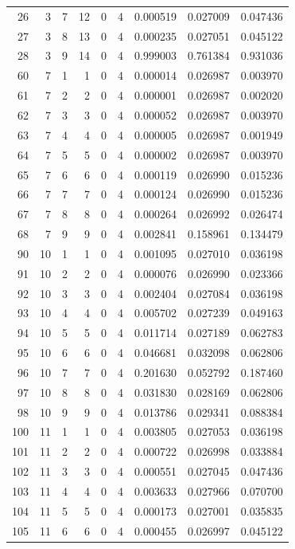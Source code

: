 \begin{longtable}{rrrrrrrrr}
26 & 3 & 7 & 12 & 0 & 4 & 0.000519 & 0.027009 & 0.047436 \\
27 & 3 & 8 & 13 & 0 & 4 & 0.000235 & 0.027051 & 0.045122 \\
28 & 3 & 9 & 14 & 0 & 4 & 0.999003 & 0.761384 & 0.931036 \\
60 & 7 & 1 & 1 & 0 & 4 & 0.000014 & 0.026987 & 0.003970 \\
61 & 7 & 2 & 2 & 0 & 4 & 0.000001 & 0.026987 & 0.002020 \\
62 & 7 & 3 & 3 & 0 & 4 & 0.000052 & 0.026987 & 0.003970 \\
63 & 7 & 4 & 4 & 0 & 4 & 0.000005 & 0.026987 & 0.001949 \\
64 & 7 & 5 & 5 & 0 & 4 & 0.000002 & 0.026987 & 0.003970 \\
65 & 7 & 6 & 6 & 0 & 4 & 0.000119 & 0.026990 & 0.015236 \\
66 & 7 & 7 & 7 & 0 & 4 & 0.000124 & 0.026990 & 0.015236 \\
67 & 7 & 8 & 8 & 0 & 4 & 0.000264 & 0.026992 & 0.026474 \\
68 & 7 & 9 & 9 & 0 & 4 & 0.002841 & 0.158961 & 0.134479 \\
90 & 10 & 1 & 1 & 0 & 4 & 0.001095 & 0.027010 & 0.036198 \\
91 & 10 & 2 & 2 & 0 & 4 & 0.000076 & 0.026990 & 0.023366 \\
92 & 10 & 3 & 3 & 0 & 4 & 0.002404 & 0.027084 & 0.036198 \\
93 & 10 & 4 & 4 & 0 & 4 & 0.005702 & 0.027239 & 0.049163 \\
94 & 10 & 5 & 5 & 0 & 4 & 0.011714 & 0.027189 & 0.062783 \\
95 & 10 & 6 & 6 & 0 & 4 & 0.046681 & 0.032098 & 0.062806 \\
96 & 10 & 7 & 7 & 0 & 4 & 0.201630 & 0.052792 & 0.187460 \\
97 & 10 & 8 & 8 & 0 & 4 & 0.031830 & 0.028169 & 0.062806 \\
98 & 10 & 9 & 9 & 0 & 4 & 0.013786 & 0.029341 & 0.088384 \\
100 & 11 & 1 & 1 & 0 & 4 & 0.003805 & 0.027053 & 0.036198 \\
101 & 11 & 2 & 2 & 0 & 4 & 0.000722 & 0.026998 & 0.033884 \\
102 & 11 & 3 & 3 & 0 & 4 & 0.000551 & 0.027045 & 0.047436 \\
103 & 11 & 4 & 4 & 0 & 4 & 0.003633 & 0.027966 & 0.070700 \\
104 & 11 & 5 & 5 & 0 & 4 & 0.000173 & 0.027001 & 0.035835 \\
105 & 11 & 6 & 6 & 0 & 4 & 0.000455 & 0.026997 & 0.045122 \\

\end{longtable}
